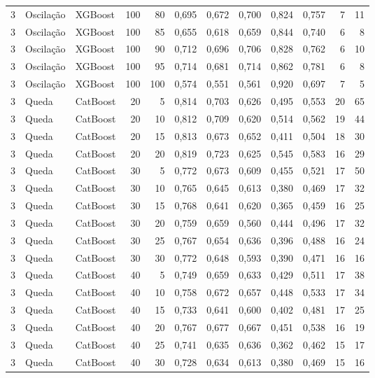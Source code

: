 \begin{longtable}{@{}rllrrrrrrrrr@{}}
3 & Oscilação & XGBoost & 100 & 80 & 0,695 & 0,672 & 0,700 & 0,824 & 0,757 & 7 & 11 \\
3 & Oscilação & XGBoost & 100 & 85 & 0,655 & 0,618 & 0,659 & 0,844 & 0,740 & 6 & 8 \\
3 & Oscilação & XGBoost & 100 & 90 & 0,712 & 0,696 & 0,706 & 0,828 & 0,762 & 6 & 10 \\
3 & Oscilação & XGBoost & 100 & 95 & 0,714 & 0,681 & 0,714 & 0,862 & 0,781 & 6 & 8 \\
3 & Oscilação & XGBoost & 100 & 100 & 0,574 & 0,551 & 0,561 & 0,920 & 0,697 & 7 & 5 \\
3 & Queda & CatBoost & 20 & 5 & 0,814 & 0,703 & 0,626 & 0,495 & 0,553 & 20 & 65 \\
3 & Queda & CatBoost & 20 & 10 & 0,812 & 0,709 & 0,620 & 0,514 & 0,562 & 19 & 44 \\
3 & Queda & CatBoost & 20 & 15 & 0,813 & 0,673 & 0,652 & 0,411 & 0,504 & 18 & 30 \\
3 & Queda & CatBoost & 20 & 20 & 0,819 & 0,723 & 0,625 & 0,545 & 0,583 & 16 & 29 \\
3 & Queda & CatBoost & 30 & 5 & 0,772 & 0,673 & 0,609 & 0,455 & 0,521 & 17 & 50 \\
3 & Queda & CatBoost & 30 & 10 & 0,765 & 0,645 & 0,613 & 0,380 & 0,469 & 17 & 32 \\
3 & Queda & CatBoost & 30 & 15 & 0,768 & 0,641 & 0,620 & 0,365 & 0,459 & 16 & 25 \\
3 & Queda & CatBoost & 30 & 20 & 0,759 & 0,659 & 0,560 & 0,444 & 0,496 & 17 & 32 \\
3 & Queda & CatBoost & 30 & 25 & 0,767 & 0,654 & 0,636 & 0,396 & 0,488 & 16 & 24 \\
3 & Queda & CatBoost & 30 & 30 & 0,772 & 0,648 & 0,593 & 0,390 & 0,471 & 16 & 16 \\
3 & Queda & CatBoost & 40 & 5 & 0,749 & 0,659 & 0,633 & 0,429 & 0,511 & 17 & 38 \\
3 & Queda & CatBoost & 40 & 10 & 0,758 & 0,672 & 0,657 & 0,448 & 0,533 & 17 & 34 \\
3 & Queda & CatBoost & 40 & 15 & 0,733 & 0,641 & 0,600 & 0,402 & 0,481 & 17 & 25 \\
3 & Queda & CatBoost & 40 & 20 & 0,767 & 0,677 & 0,667 & 0,451 & 0,538 & 16 & 19 \\
3 & Queda & CatBoost & 40 & 25 & 0,741 & 0,635 & 0,636 & 0,362 & 0,462 & 15 & 17 \\
3 & Queda & CatBoost & 40 & 30 & 0,728 & 0,634 & 0,613 & 0,380 & 0,469 & 15 & 16 \\

\end{longtable}
